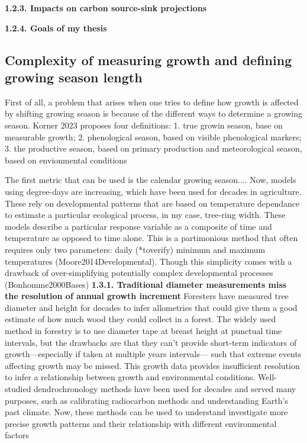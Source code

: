 \documentclass{article}
\begin{document}
\textbf{1.2.3. Impacts on carbon source-sink projections} 

\textbf{1.2.4. Goals of my thesis} 

\subsection{Complexity of measuring growth and defining growing season length}
First of all, a problem that arises when one tries to define how growth is affected by shifting growing season is because of the different ways to determine a growing season. Korner 2023 proposes four definitions: 1. true growin season, base on measurable growth; 2. phenological season, based on visible phenological markers; 3. the productive season, based on primary production and meteorological season, based on envionmental conditions %

The first metric that can be used is the calendar growing season.... Now, models using degree-days are increasing, which have been used for decades in agriculture. These rely on developmental patterns that are based on temperature dependance to estimate a particular ecological process, in my case, tree-ring width. These models describe a particular response variable as a composite of time and temperature as opposed to time alone. This is a partimonious method that often requires only two parameters: daily (*toverify) minimum and maximum temperatures (Moore2014Developmental).  Though this simplicity comes with a drawback of over-simplifying potentially complex developmental processes (Bonhomme2000Bases)
\textbf{1.3.1. Traditional diameter measurements miss the resolution of annual growth increment}
Foresters have measured tree diameter and height for decades to infer allometries that could give them a good estimate of how much wood they could collect in a forest. The widely used method in forestry is to use diameter tape at breast height at punctual time intervals, but the drawbacks are that they can't provide short-term indicators of growth---especially if taken at multiple years intervals--- such that extreme events affecting growth may be missed. This growth data provides insufficient resolution to infer a relationship between growth and environmental conditions. Well-studied dendrochronology methods have been used for decades and served many purposes, such as calibrating radiocarbon methods and understanding Earth's past climate. Now, these methods can be used to understand investigate more precise growth patterns and their relationship with different environmental factors
\end{document}
